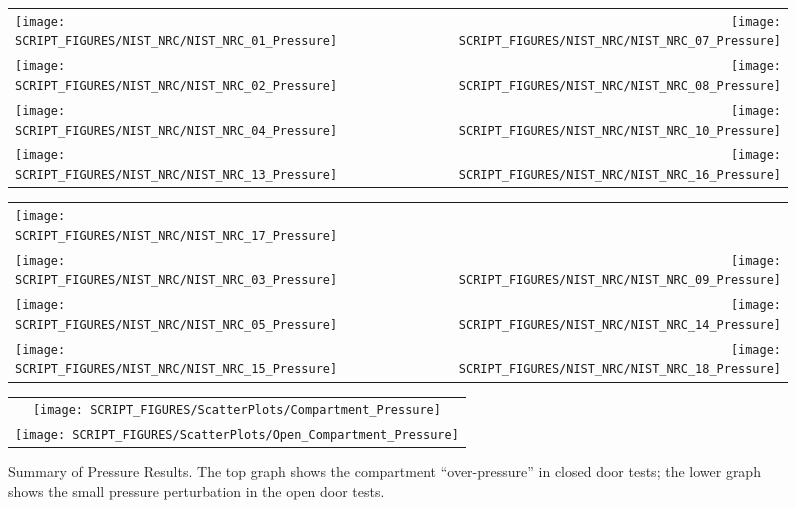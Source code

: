 \begin{figure}[p]
\begin{tabular*}{\textwidth}{l@{\extracolsep{\fill}}r}
\texttt{[image: SCRIPT\_FIGURES/NIST\_NRC/NIST\_NRC\_01\_Pressure]} &
\texttt{[image: SCRIPT\_FIGURES/NIST\_NRC/NIST\_NRC\_07\_Pressure]} \\
\texttt{[image: SCRIPT\_FIGURES/NIST\_NRC/NIST\_NRC\_02\_Pressure]} &
\texttt{[image: SCRIPT\_FIGURES/NIST\_NRC/NIST\_NRC\_08\_Pressure]} \\
\texttt{[image: SCRIPT\_FIGURES/NIST\_NRC/NIST\_NRC\_04\_Pressure]} &
\texttt{[image: SCRIPT\_FIGURES/NIST\_NRC/NIST\_NRC\_10\_Pressure]} \\
\texttt{[image: SCRIPT\_FIGURES/NIST\_NRC/NIST\_NRC\_13\_Pressure]} &
\texttt{[image: SCRIPT\_FIGURES/NIST\_NRC/NIST\_NRC\_16\_Pressure]}
\end{tabular*}
\label{NIST_NRC_Pressure_Closed}
\end{figure}

\begin{figure}[p]
\begin{tabular*}{\textwidth}{l@{\extracolsep{\fill}}r}
\texttt{[image: SCRIPT\_FIGURES/NIST\_NRC/NIST\_NRC\_17\_Pressure]} &
   \\
\texttt{[image: SCRIPT\_FIGURES/NIST\_NRC/NIST\_NRC\_03\_Pressure]} &
\texttt{[image: SCRIPT\_FIGURES/NIST\_NRC/NIST\_NRC\_09\_Pressure]} \\
\texttt{[image: SCRIPT\_FIGURES/NIST\_NRC/NIST\_NRC\_05\_Pressure]} &
\texttt{[image: SCRIPT\_FIGURES/NIST\_NRC/NIST\_NRC\_14\_Pressure]} \\
\texttt{[image: SCRIPT\_FIGURES/NIST\_NRC/NIST\_NRC\_15\_Pressure]} &
\texttt{[image: SCRIPT\_FIGURES/NIST\_NRC/NIST\_NRC\_18\_Pressure]}
\end{tabular*}
\label{NIST_NRC_Pressure_Open}
\end{figure}

\begin{figure}[p]
\begin{center}
\begin{tabular}{c}
\texttt{[image: SCRIPT\_FIGURES/ScatterPlots/Compartment\_Pressure]} \\
\texttt{[image: SCRIPT\_FIGURES/ScatterPlots/Open\_Compartment\_Pressure]}
\end{tabular}
\end{center}
\caption[Summary of pressure predictions, NIST/NRC test series.]
{Summary of Pressure Results. The top graph shows the compartment ``over-pressure'' in closed door tests; the lower graph
shows the small pressure perturbation in the open door tests.}
\end{figure}



